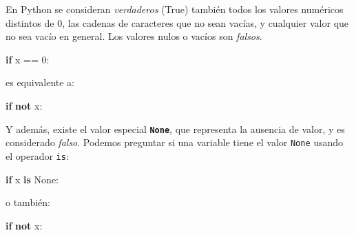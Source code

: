 \documentclass[
  letterpaper,
  DIV=11,
  numbers=noendperiod]{scrreprt}
\newenvironment{Shaded}{\begin{snugshade}}{\end{snugshade}}
\newcommand{\ControlFlowTok}[1]{\textcolor[rgb]{0.00,0.23,0.31}{\textbf{#1}}}
\newcommand{\DecValTok}[1]{\textcolor[rgb]{0.68,0.00,0.00}{#1}}
\newcommand{\KeywordTok}[1]{\textcolor[rgb]{0.00,0.23,0.31}{\textbf{#1}}}
\newcommand{\NormalTok}[1]{\textcolor[rgb]{0.00,0.23,0.31}{#1}}
\newcommand{\OperatorTok}[1]{\textcolor[rgb]{0.37,0.37,0.37}{#1}}
\newcommand{\VariableTok}[1]{\textcolor[rgb]{0.07,0.07,0.07}{#1}}
\begin{document}
\begin{tcolorbox}[enhanced jigsaw, opacitybacktitle=0.6, toptitle=1mm, toprule=.15mm, arc=.35mm, breakable, bottomrule=.15mm, opacityback=0, leftrule=.75mm, rightrule=.15mm, title=\textcolor{quarto-callout-tip-color}{\faLightbulb}\hspace{0.5em}{Sabías que\ldots{} ?}, left=2mm, bottomtitle=1mm, colframe=quarto-callout-tip-color-frame, colback=white, titlerule=0mm, coltitle=black, colbacktitle=quarto-callout-tip-color!10!white]

En Python se consideran \emph{verdaderos} (True) también todos los
valores numéricos distintos de 0, las cadenas de caracteres que no sean
vacías, y cualquier valor que no sea vacío en general. Los valores nulos
o vacíos son \emph{falsos}.

\begin{Shaded}
\begin{Highlighting}[]
\ControlFlowTok{if}\NormalTok{ x }\OperatorTok{==} \DecValTok{0}\NormalTok{:}
\end{Highlighting}
\end{Shaded}

es equivalente a:

\begin{Shaded}
\begin{Highlighting}[]
\ControlFlowTok{if} \KeywordTok{not}\NormalTok{ x:}
\end{Highlighting}
\end{Shaded}

Y además, existe el valor especial \textbf{\texttt{None}}, que
representa la ausencia de valor, y es considerado \emph{falso}. Podemos
preguntar si una variable tiene el valor \texttt{None} usando el
operador \texttt{is}:

\begin{Shaded}
\begin{Highlighting}[]
\ControlFlowTok{if}\NormalTok{ x }\KeywordTok{is} \VariableTok{None}\NormalTok{:}
\end{Highlighting}
\end{Shaded}

o también:

\begin{Shaded}
\begin{Highlighting}[]
\ControlFlowTok{if} \KeywordTok{not}\NormalTok{ x:}
\end{Highlighting}
\end{Shaded}

\end{tcolorbox}
\end{document}
